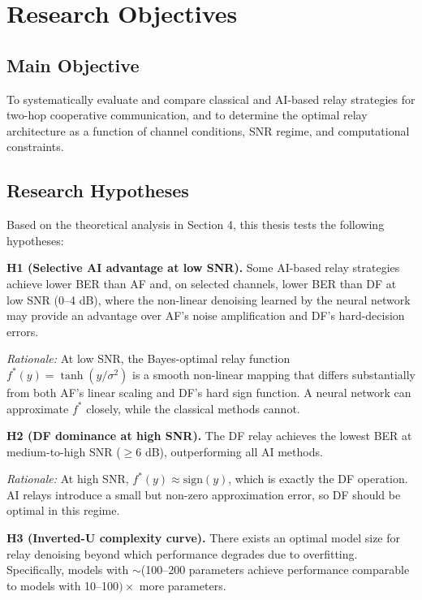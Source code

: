 \chapter{Research Objectives}\label{sec:research-objectives}

\section{Main Objective}\label{sec:main-objective}

To systematically evaluate and compare classical and AI-based relay strategies for two-hop cooperative communication, and to determine the optimal relay architecture as a function of channel conditions, SNR regime, and computational constraints.

\section{Research Hypotheses}\label{sec:research-hypotheses}

Based on the theoretical analysis in Section 4, this thesis tests the following hypotheses:

\textbf{H1 (Selective AI advantage at low SNR).} Some AI-based relay strategies achieve lower BER than AF and, on selected channels, lower BER than DF at low SNR (0--4 dB), where the non-linear denoising learned by the neural network may provide an advantage over AF's noise amplification and DF's hard-decision errors.

\emph{Rationale:} At low SNR, the Bayes-optimal relay function \(f^*(y) = \tanh(y/\sigma^2)\) is a smooth non-linear mapping that differs substantially from both AF's linear scaling and DF's hard sign function. A neural network can approximate \(f^*\) closely, while the classical methods cannot.

\textbf{H2 (DF dominance at high SNR).} The DF relay achieves the lowest BER at medium-to-high SNR (\(\geq 6\) dB), outperforming all AI methods.

\emph{Rationale:} At high SNR, \(f^*(y) \approx \text{sign}(y)\), which is exactly the DF operation. AI relays introduce a small but non-zero approximation error, so DF should be optimal in this regime.

\textbf{H3 (Inverted-U complexity curve).} There exists an optimal model size for relay denoising beyond which performance degrades due to overfitting. Specifically, models with $\sim$(100–200 parameters achieve performance comparable to models with 10–100$)\times$ more parameters.

